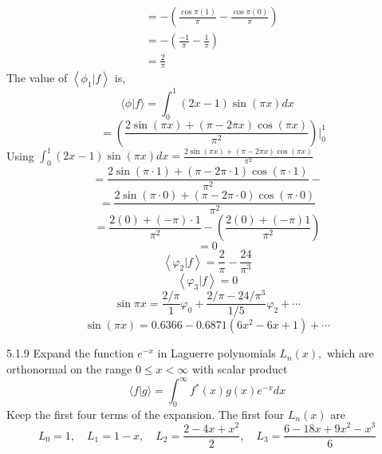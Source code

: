 \documentclass{article}
\begin{document}
\begin{flushleft}
$$\begin{aligned}
&=-\left(\frac{\cos \pi(1)}{\pi}-\frac{\cos \pi(0)}{\pi}\right) \\
&=-\left(\frac{-1}{\pi}-\frac{1}{\pi}\right) \\
&=\frac{2}{\pi}
\end{aligned}
$$
The value of $\left\langle\phi_{1} | f\right\rangle$ is,
$$\langle\phi | f\rangle=\int_{0}^{1}(2 x-1) \sin (\pi x) d x$$
$$\quad=\left(\frac{2 \sin (\pi x)+(\pi-2 \pi x) \cos (\pi x)}{\pi^{2}}\right)\Bigg|_{0}^{1}$$
Using $\int_{0}^{1}(2 x-1) \sin (\pi x) d x=\frac{2 \sin (\pi x)+(\pi-2 \pi x) \cos (\pi x)}{\pi^{2}}$
$$=\frac{2 \sin (\pi \cdot 1)+(\pi-2 \pi \cdot 1) \cos (\pi \cdot 1)}{\pi^{2}}-$$
$$=\frac{2 \sin (\pi \cdot 0)+(\pi-2 \pi \cdot 0) \cos (\pi \cdot 0)}{\pi^{2}}$$
$$=\frac{2(0)+(-\pi) \cdot 1}{\pi^{2}}-\left(\frac{2(0)+(-\pi) 1}{\pi^{2}}\right)$$
$$=0$$
$$
\left\langle\varphi_{2} | f\right\rangle=\frac{2}{\pi}-\frac{24}{\pi^{3}}
$$
$$
\left\langle\varphi_{3} | f\right\rangle=0
$$
$$
\sin \pi x=\frac{2 / \pi}{1} \varphi_{0}+\frac{2 / \pi-24 / \pi^{3}}{1 / 5} \varphi_{2}+\cdots
$$
$$\sin(\pi x) =0.6366-0.6871\left(6 x^{2}-6 x+1\right)+\cdots $$

\newpage

\begin{mybox}{5.1.9}
Expand the function $e^{-x}$ in Laguerre polynomials $L_{n}(x),$ which are orthonormal on the range $0 \leq x<\infty$ with scalar product
$$
\langle f | g\rangle=\int_{0}^{\infty} f^{*}(x) g(x) e^{-x} d x
$$
Keep the first four terms of the expansion. The first four $L_{n}(x)$ are
$$
L_{0}=1, \quad L_{1}=1-x, \quad L_{2}=\frac{2-4 x+x^{2}}{2}, \quad L_{3}=\frac{6-18 x+9 x^{2}-x^{3}}{6}
$$
\end{mybox}


\end{flushleft}
\end{document}
